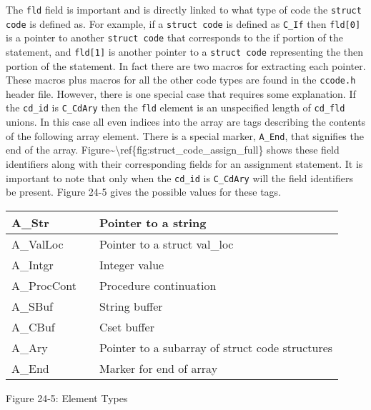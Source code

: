The \texttt{fld} field is important and is directly linked to what
type of code the \texttt{struct code} is defined as.  For example, if
a \texttt{struct code} is defined as \texttt{C\_If} then
\texttt{fld[0]} is a pointer to another \texttt{struct code} that
corresponds to the if portion of the statement, and \texttt{fld[1]} is
another pointer to a \texttt{struct code} representing the then
portion of the statement. In fact there are two macros for extracting
each pointer. These macros plus macros for all the other code types
are found in the \texttt{ccode.h} header file. However, there is one
special case that requires some explanation. If the \texttt{cd\_id} is
\texttt{C\_CdAry} then the \texttt{fld} element is an unspecified
length of \texttt{cd\_fld} unions. In this case all even indices into
the array are tags describing the contents of the following array
element. There is a special marker, \texttt{A\_End}, that signifies
the end of the array.
Figure\~{}{\textbackslash}ref\{fig:struct\_code\_assign\_full\} shows
these field identifiers along with their corresponding fields for an
assignment statement. It is important to note that only when the
\texttt{cd\_id} is \texttt{C\_CdAry} will the field identifiers be
present. Figure 24-5 gives the possible values for these tags.

\begin{center}
\tabletail{}
\tablelasttail{}
\begin{xtabular}{|m{0.93935984in}|m{0.41775984in}|m{3.12266in}|}
\hline
 A\_Str &
 &
 Pointer to a string\\\hline
 A\_ValLoc &
 &
 Pointer to a struct val\_loc\\\hline
 A\_Intgr &
 &
 Integer value\\\hline
 A\_ProcCont &
 &
 Procedure continuation\\\hline
 A\_SBuf &
 &
 String buffer\\\hline
 A\_CBuf &
 &
 Cset buffer\\\hline
 A\_Ary &
 &
 Pointer to a subarray of struct code structures\\\hline
 A\_End &
 &
 Marker for end of array\\\hline
\end{xtabular}
\end{center}
{\centering{}
Figure 24-5: Element Types
\par}

